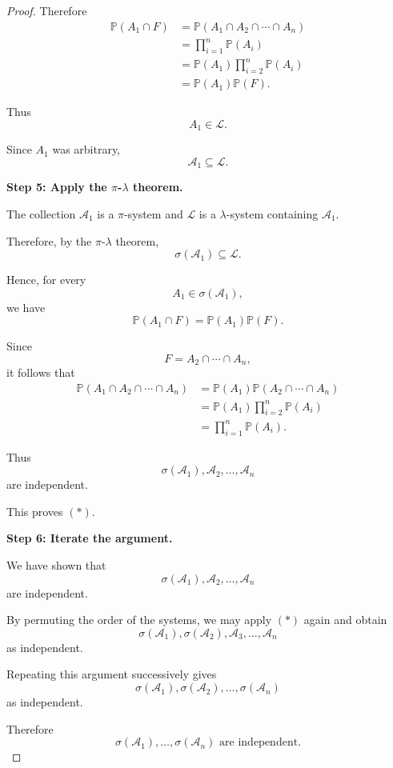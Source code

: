 \begin{proof}
Therefore
\[
\begin{aligned}
\mathbb{P}(A_1\cap F)
&=
\mathbb{P}(A_1\cap A_2\cap\cdots\cap A_n)\\
&=
\prod_{i=1}^{n}\mathbb{P}(A_i)\\
&=
\mathbb{P}(A_1)
\prod_{i=2}^{n}\mathbb{P}(A_i)\\
&=
\mathbb{P}(A_1)\mathbb{P}(F).
\end{aligned}
\]

Thus
\[
A_1\in\mathcal{L}.
\]

Since $A_1$ was arbitrary,
\[
\mathcal{A}_1\subseteq\mathcal{L}.
\]

\medskip

\textbf{Step 5: Apply the $\pi$-$\lambda$ theorem.}

The collection $\mathcal{A}_1$ is a $\pi$-system and
$\mathcal{L}$ is a $\lambda$-system containing $\mathcal{A}_1$.

Therefore, by the $\pi$-$\lambda$ theorem,
\[
\sigma(\mathcal{A}_1)\subseteq\mathcal{L}.
\]

Hence, for every
\[
A_1\in\sigma(\mathcal{A}_1),
\]
we have
\[
\mathbb{P}(A_1\cap F)
=
\mathbb{P}(A_1)\mathbb{P}(F).
\]

Since
\[
F=A_2\cap\cdots\cap A_n,
\]
it follows that
\[
\begin{aligned}
\mathbb{P}(A_1\cap A_2\cap\cdots\cap A_n)
&=
\mathbb{P}(A_1)
\mathbb{P}(A_2\cap\cdots\cap A_n)\\
&=
\mathbb{P}(A_1)
\prod_{i=2}^{n}\mathbb{P}(A_i)\\
&=
\prod_{i=1}^{n}\mathbb{P}(A_i).
\end{aligned}
\]

Thus
\[
\sigma(\mathcal{A}_1),
\mathcal{A}_2,\ldots,\mathcal{A}_n
\]
are independent.

This proves $(\ast)$.

\medskip

\textbf{Step 6: Iterate the argument.}

We have shown that
\[
\sigma(\mathcal{A}_1),
\mathcal{A}_2,\ldots,\mathcal{A}_n
\]
are independent.

By permuting the order of the systems, we may apply $(\ast)$ again
and obtain
\[
\sigma(\mathcal{A}_1),
\sigma(\mathcal{A}_2),
\mathcal{A}_3,\ldots,\mathcal{A}_n
\]
as independent.

Repeating this argument successively gives
\[
\sigma(\mathcal{A}_1),
\sigma(\mathcal{A}_2),
\ldots,
\sigma(\mathcal{A}_n)
\]
as independent.

Therefore
\[
\boxed{
\sigma(\mathcal{A}_1),\ldots,\sigma(\mathcal{A}_n)
\text{ are independent}.
}
\]

\end{proof}


